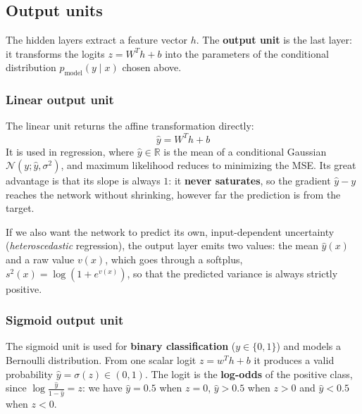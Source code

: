 \subsection{Output units}
\label{sec:output-units}
The hidden layers extract a feature vector $h$. The \textbf{output unit} is the
last layer: it transforms the logits $z = W^T h + b$ into the parameters of the
conditional distribution $p_{\text{model}}(y \mid x)$ chosen above.

\subsubsection{Linear output unit}
The linear unit returns the affine transformation directly:
\begin{equation}
    \hat{y} = W^T h + b
\end{equation}
It is used in regression, where $\hat{y} \in \mathbb{R}$ is the mean of a
conditional Gaussian $\mathcal{N}(y; \hat{y}, \sigma^2)$, and maximum likelihood
reduces to minimizing the MSE. Its great advantage is that its slope is always $1$:
it \textbf{never saturates}, so the gradient $\hat{y} - y$ reaches the network
without shrinking, however far the prediction is from the target.

If we also want the network to predict its own, input-dependent uncertainty
(\emph{heteroscedastic} regression), the output layer emits two values: the mean
$\hat{y}(x)$ and a raw value $v(x)$, which goes through a softplus,
$s^2(x) = \log(1 + e^{v(x)})$, so that the predicted variance is always strictly
positive.

\subsubsection{Sigmoid output unit}
The sigmoid unit is used for \textbf{binary classification} ($y \in \{0, 1\}$) and
models a Bernoulli distribution. From one scalar logit $z = w^T h + b$ it produces
a valid probability $\hat{y} = \sigma(z) \in (0,1)$. The logit is the
\textbf{log-odds} of the positive class, since
$\log \frac{\hat{y}}{1 - \hat{y}} = z$: we have $\hat{y} = 0.5$ when $z = 0$,
$\hat{y} > 0.5$ when $z > 0$ and $\hat{y} < 0.5$ when $z < 0$.

